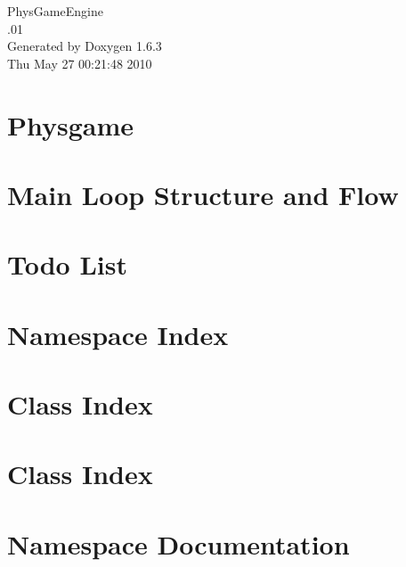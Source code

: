 \documentclass[a4paper]{book}
\begin{document}
\hypersetup{pageanchor=false}
\begin{titlepage}
\vspace*{7cm}
\begin{center}
{\Large PhysGameEngine \\[1ex]\large .01 }\\
\vspace*{1cm}
{\large Generated by Doxygen 1.6.3}\\
\vspace*{0.5cm}
{\small Thu May 27 00:21:48 2010}\\
\end{center}
\end{titlepage}
\clearemptydoublepage
{}
\tableofcontents
\clearemptydoublepage
{}
\hypersetup{pageanchor=true}
\chapter{Physgame}
\label{index}\hypertarget{index}{}
\chapter{Main Loop Structure and Flow}
\label{mainloop1}
\hypertarget{mainloop1}{}

\chapter{Todo List}
\label{todo}
\hypertarget{todo}{}

\chapter{Namespace Index}

\chapter{Class Index}

\chapter{Class Index}

\chapter{Namespace Documentation}




\end{document}
